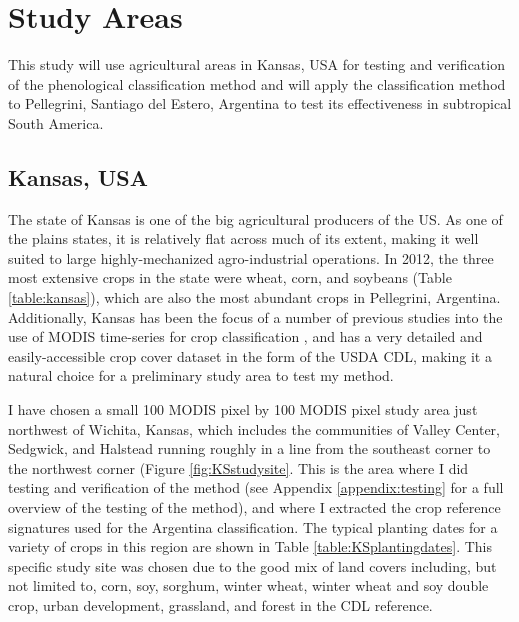 \chapter{Study Areas}

This study will use agricultural areas in Kansas, USA for testing and verification of the phenological classification method and will apply the classification method to Pellegrini, Santiago del Estero, Argentina to test its effectiveness in subtropical South America.

\section{Kansas, USA}

The state of Kansas is one of the big agricultural producers of the US. As one of the plains states, it is relatively flat across much of its extent, making it well suited to large highly-mechanized agro-industrial operations. In 2012, the three most extensive crops in the state were wheat, corn, and soybeans (Table \ref{table:kansas}), which are also the most abundant crops in Pellegrini, Argentina. Additionally, Kansas has been the focus of a number of previous studies into the use of MODIS time-series for crop classification \autocites{wardlow2002discriminating}{wardlow2005state-level}{wardlow2007analysis}{wardlow2008large-area}, and has a very detailed and easily-accessible crop cover dataset in the form of the USDA CDL, making it a natural choice for a preliminary study area to test my method.

I have chosen a small 100 MODIS pixel by 100 MODIS pixel study area just northwest of Wichita, Kansas, which includes the communities of Valley Center, Sedgwick, and Halstead running roughly in a line from the southeast corner to the northwest corner (Figure \ref{fig:KSstudysite}. This is the area where I did testing and verification of the method (see Appendix \ref{appendix:testing} for a full overview of the testing of the method), and where I extracted the crop reference signatures used for the Argentina classification. The typical planting dates for a variety of crops in this region are shown in Table \ref{table:KSplantingdates}. This specific study site was chosen due to the good mix of land covers including, but not limited to, corn, soy, sorghum, winter wheat, winter wheat and soy double crop, urban development, grassland, and forest in the CDL reference.

